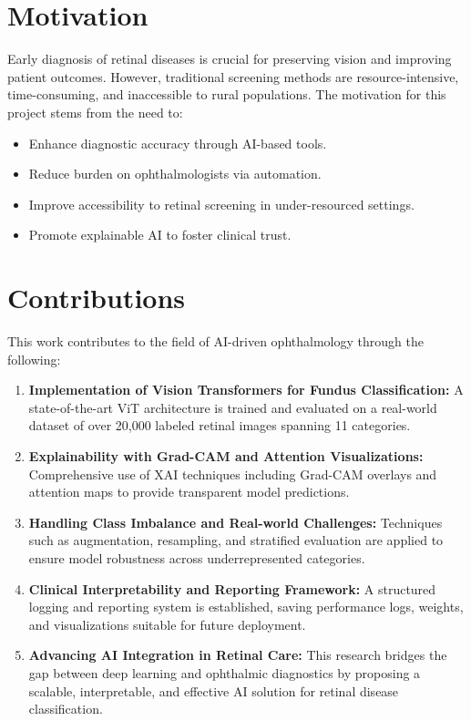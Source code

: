 \documentclass[a4paper,12pt]{report}
\begin{document}
\section{Motivation}

Early diagnosis of retinal diseases is crucial for preserving vision and improving patient outcomes. However, traditional screening methods are resource-intensive, time-consuming, and inaccessible to rural populations. The motivation for this project stems from the need to:
\begin{itemize}
    \item Enhance diagnostic accuracy through AI-based tools.
    \item Reduce burden on ophthalmologists via automation.
    \item Improve accessibility to retinal screening in under-resourced settings.
    \item Promote explainable AI to foster clinical trust.
\end{itemize}

\section{Contributions}

This work contributes to the field of AI-driven ophthalmology through the following:

\begin{enumerate}
    \item \textbf{Implementation of Vision Transformers for Fundus Classification:} A state-of-the-art ViT architecture is trained and evaluated on a real-world dataset of over 20,000 labeled retinal images spanning 11 categories.

    \item \textbf{Explainability with Grad-CAM and Attention Visualizations:} Comprehensive use of XAI techniques including Grad-CAM overlays and attention maps to provide transparent model predictions.


    \item \textbf{Handling Class Imbalance and Real-world Challenges:} Techniques such as augmentation, resampling, and stratified evaluation are applied to ensure model robustness across underrepresented categories.

    \item \textbf{Clinical Interpretability and Reporting Framework:} A structured logging and reporting system is established, saving performance logs, weights, and visualizations suitable for future deployment.

    \item \textbf{Advancing AI Integration in Retinal Care:} This research bridges the gap between deep learning and ophthalmic diagnostics by proposing a scalable, interpretable, and effective AI solution for retinal disease classification.
\end{enumerate}
\end{document}
